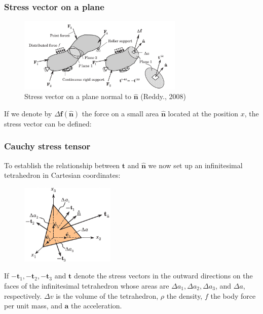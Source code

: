 \documentclass[notes]{beamer}
\begin{document}
\begin{frame}
\frametitle{Stress vector on a plane}
\begin{figure}[ht]
	\centering
	\includegraphics[width=0.7\textwidth]{figs/stress-vector-plane.png}
	\caption*{Stress vector on a plane normal to $\mathbf{\hat{n}}$ (Reddy., 2008)}
\end{figure}

If we denote by $\Delta \mathbf{f(\hat{n})}$ the force on a small area $\mathbf{\hat{n}}$ located at the position $x$, the stress vector can be defined:
\end{frame}

\begin{frame}
\frametitle{Cauchy stress tensor}
To establish the relationship between $\mathbf{t}$ and $\mathbf{\hat{n}}$ we now set up an infinitesimal
tetrahedron in Cartesian coordinates:
\begin{figure}[ht]
	\centering
	\includegraphics[width=0.4\textwidth]{figs/stress-tetrahedron.png}
\end{figure}
If $\mathbf{-t}_1, \mathbf{-t}_2, \mathbf{-t}_3$ and $\mathbf{t}$ denote the stress vectors in the outward directions on the faces of the infinitesimal tetrahedron whose areas are $\Delta a_1, \Delta a_2, \Delta a_3$, and $\Delta a$, respectively. $\Delta v$ is the volume of the tetrahedron, $\rho$ the density, $f$ the body force per unit mass, and $\mathbf{a}$ the acceleration. 
\end{frame}
\end{document}
